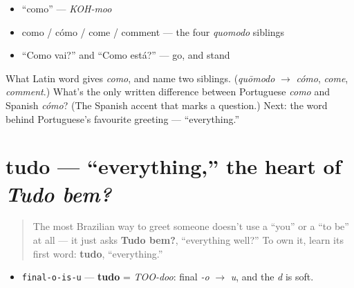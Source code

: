 \begin{itemize}
\raggedright
  \item \textquotedblleft{}como\textquotedblright{} — \emph{KOH-moo}
  \item como / cómo / come / comment — the four \emph{quomodo} siblings
  \item \textquotedblleft{}Como vai?\textquotedblright{} and \textquotedblleft{}Como está?\textquotedblright{} — go, and stand
\end{itemize}

\begin{tcolorbox}[breakable,colback=teal!4,colframe=teal!35!black,title={Before you move on}]
What Latin word gives \emph{como}, and name two siblings. (\emph{quōmodo} $\to$ \emph{cómo}, \emph{come}, \emph{comment}.) What's the only written difference between Portuguese \emph{como} and Spanish \emph{cómo}? (The Spanish accent that marks a question.) Next: the word behind Portuguese's favourite greeting — \textquotedblleft{}everything.\textquotedblright{}
\end{tcolorbox}
\section[tudo]{tudo — \textquotedblleft{}everything,\textquotedblright{} the heart of \emph{Tudo bem?}}

\label{lesson:PT-C02-tudo}



\begin{quote}
The most Brazilian way to greet someone doesn't use a \textquotedblleft{}you\textquotedblright{} or a \textquotedblleft{}to be\textquotedblright{} at all — it just asks \textbf{Tudo bem?}, \textquotedblleft{}everything well?\textquotedblright{} To own it, learn its first word: \textbf{tudo}, \textquotedblleft{}everything.\textquotedblright{}
\end{quote}

\begin{sounds}
\begin{itemize}
\raggedright
  \item \texttt{final-o-is-u} — \textbf{tudo} = \emph{TOO-doo}: final \emph{-o} $\to$ \emph{u}, and the \emph{d} is soft.
\end{itemize}
\end{sounds}

